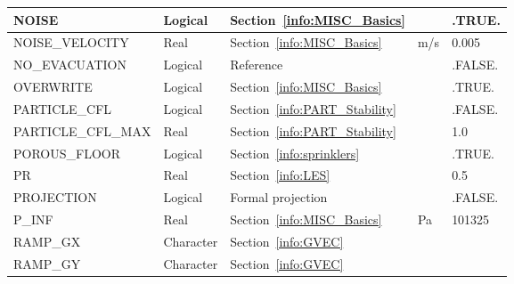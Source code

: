 \documentclass[11pt]{book}
\begin{document}
\begin{longtable}{@{\extracolsep{\fill}}|l|l|l|l|l|}
{\ct NOISE}                                     & Logical       & Section~\ref{info:MISC_Basics}                        &               & {\ct .TRUE.}      \\ \hline
{\ct NOISE\_VELOCITY}                           & Real          & Section~\ref{info:MISC_Basics}                        &  m/s          & 0.005             \\ \hline
{\ct NO\_EVACUATION}                            & Logical       & Reference~\cite{FDS_Evac_Users_Guide}                 &               & {\ct .FALSE.}     \\ \hline
{\ct OVERWRITE}                                 & Logical       & Section~\ref{info:MISC_Basics}                        &               & {\ct .TRUE.}      \\ \hline
{\ct PARTICLE\_CFL}                             & Logical       & Section~\ref{info:PART_Stability}                     &               & {\ct .FALSE.}     \\ \hline
{\ct PARTICLE\_CFL\_MAX}                        & Real          & Section~\ref{info:PART_Stability}                     &               & 1.0               \\ \hline
{\ct POROUS\_FLOOR}                             & Logical       & Section~\ref{info:sprinklers}                         &               & {\ct .TRUE.}      \\ \hline
{\ct PR}                                        & Real          & Section~\ref{info:LES}                                &               & 0.5               \\ \hline
{\ct PROJECTION}                                & Logical       & Formal projection                                     &               & {\ct .FALSE.}     \\ \hline
{\ct P\_INF}                                    & Real          & Section~\ref{info:MISC_Basics}                        & Pa            & 101325            \\ \hline
{\ct RAMP\_GX}                                  & Character     & Section~\ref{info:GVEC}                               &               &                   \\ \hline
{\ct RAMP\_GY}                                  & Character     & Section~\ref{info:GVEC}                               &               &                   \\ \hline

\end{longtable}
\end{document}
